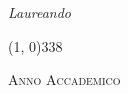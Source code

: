 \begin{titlepage}
\begin{center}
\begin{large}
\vspace{0pt} 

\begin{flushright}
\textit{Laureando}\\ 
\vspace{5pt} 
\myName
\end{flushright}
\end{large}

\vspace{40pt}

\line(1, 0){338} \\
\begin{normalsize}
\textsc{Anno Accademico \myAA}
\end{normalsize}

\end{center}
\end{titlepage} 